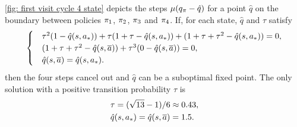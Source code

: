 \autoref{fig: first visit cycle 4 state} depicts the steps $\mu (q_\pi - \hat{q})$ for a point $\hat{q}$ on the boundary between policies $\pi_1$, $\pi_2$, $\pi_3$ and $\pi_4$.
If, for each state, $\hat{q}$ and $\tau$ satisfy
\begin{align*}
    \begin{cases}
        &\tau^2 (1 - \hat{q}(s, {a}_*)) + \tau (1+\tau - \hat{q}(s, {a}_*)) 
        + ( 1 + \tau + \tau^2 - \hat{q}(s, {a}_*) ) = 0 ,
        \\
        &( 1 + \tau + \tau^2 - \hat{q}(s, \overline{a}) ) + \tau^3( 0 - \hat{q}(s, \overline{a})) = 0 ,
        \\
        &\hat{q}(s, \overline{a}) = \hat{q}(s, {a}_*) .
    \end{cases}
\end{align*}
then the four steps cancel out and $\hat{q}$ can be a suboptimal fixed point.
The only solution with a positive transition probability $\tau$ is
\begin{align}
\label{eq: def 4s transition}
    &\tau = (\sqrt{13}-1)/6 \approx 0.43 ,
    \\
\label{eq: def 4s fixed point}
    &\hat{q}(s, {a}_*) = \hat{q}(s, \overline{a}) = 1.5 .
\end{align}





